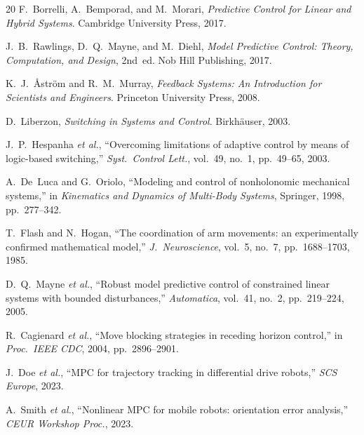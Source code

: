 \documentclass[journal]{IEEEtran}
\begin{document}

\begin{thebibliography}{20}
  F.~Borrelli, A.~Bemporad, and M.~Morari,
  \textit{Predictive Control for Linear and Hybrid Systems}.
  Cambridge University Press, 2017.

  J.~B.~Rawlings, D.~Q.~Mayne, and M.~Diehl,
  \textit{Model Predictive Control: Theory, Computation, and Design}, 2nd~ed.
  Nob Hill Publishing, 2017.

  K.~J.~\r{A}str\"{o}m and R.~M.~Murray,
  \textit{Feedback Systems: An Introduction for Scientists and Engineers}.
  Princeton University Press, 2008.

  D.~Liberzon,
  \textit{Switching in Systems and Control}.
  Birkh\"{a}user, 2003.

  J.~P.~Hespanha \textit{et al.},
  ``Overcoming limitations of adaptive control by means of logic-based
  switching,''
  \textit{Syst.\ Control Lett.}, vol.~49, no.~1, pp.~49--65, 2003.

  A.~De~Luca and G.~Oriolo,
  ``Modeling and control of nonholonomic mechanical systems,''
  in \textit{Kinematics and Dynamics of Multi-Body Systems}, Springer, 1998,
  pp.~277--342.

  T.~Flash and N.~Hogan,
  ``The coordination of arm movements: an experimentally confirmed
  mathematical model,''
  \textit{J.\ Neuroscience}, vol.~5, no.~7, pp.~1688--1703, 1985.

  D.~Q.~Mayne \textit{et al.},
  ``Robust model predictive control of constrained linear systems with
  bounded disturbances,''
  \textit{Automatica}, vol.~41, no.~2, pp.~219--224, 2005.

  R.~Cagienard \textit{et al.},
  ``Move blocking strategies in receding horizon control,''
  in \textit{Proc.\ IEEE CDC}, 2004, pp.\ 2896--2901.

  J.~Doe \textit{et al.},
  ``MPC for trajectory tracking in differential drive robots,''
  \textit{SCS Europe}, 2023.

  A.~Smith \textit{et al.},
  ``Nonlinear MPC for mobile robots: orientation error analysis,''
  \textit{CEUR Workshop Proc.}, 2023.


\end{thebibliography}
\end{document}

